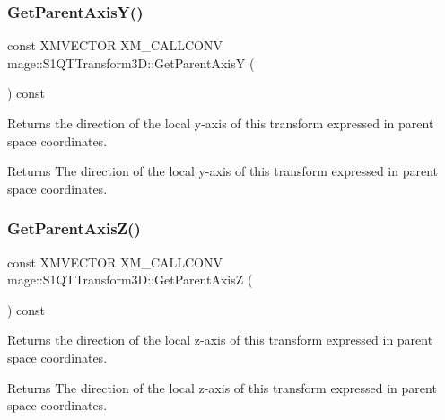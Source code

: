 \subsubsection{\texorpdfstring{Get\+Parent\+Axis\+Y()}{GetParentAxisY()}}
{\footnotesize\ttfamily const X\+M\+V\+E\+C\+T\+OR X\+M\+\_\+\+C\+A\+L\+L\+C\+O\+NV mage\+::\+S1\+Q\+T\+Transform3\+D\+::\+Get\+Parent\+AxisY (\begin{DoxyParamCaption}{ }\end{DoxyParamCaption}) const\hspace{0.3cm}{\ttfamily [noexcept]}}

Returns the direction of the local y-\/axis of this transform expressed in parent space coordinates.

\begin{DoxyReturn}{Returns}
The direction of the local y-\/axis of this transform expressed in parent space coordinates. 
\end{DoxyReturn}
\mbox{\label{classmage_1_1_s1_q_t_transform3_d_aae1d106ca39ad669e0250ee5d3a9a426}} 
\subsubsection{\texorpdfstring{Get\+Parent\+Axis\+Z()}{GetParentAxisZ()}}
{\footnotesize\ttfamily const X\+M\+V\+E\+C\+T\+OR X\+M\+\_\+\+C\+A\+L\+L\+C\+O\+NV mage\+::\+S1\+Q\+T\+Transform3\+D\+::\+Get\+Parent\+AxisZ (\begin{DoxyParamCaption}{ }\end{DoxyParamCaption}) const\hspace{0.3cm}{\ttfamily [noexcept]}}

Returns the direction of the local z-\/axis of this transform expressed in parent space coordinates.

\begin{DoxyReturn}{Returns}
The direction of the local z-\/axis of this transform expressed in parent space coordinates. 
\end{DoxyReturn}
\mbox{\label{classmage_1_1_s1_q_t_transform3_d_ad8ac0803a34f03e7ab7dfdc79256631c}} 
